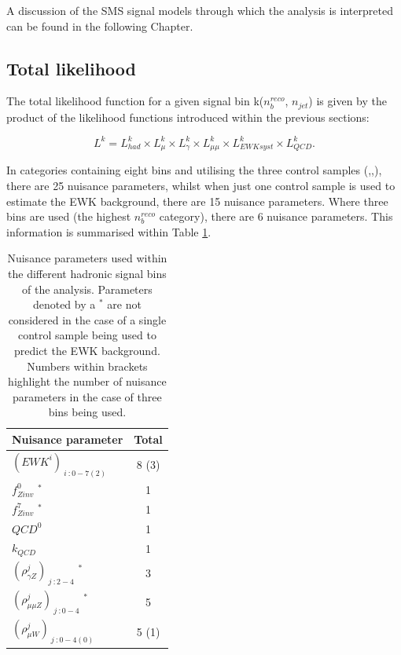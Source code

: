 A discussion of the \ac{SMS} signal models through which the analysis is interpreted can be found in the following Chapter. 

\subsection{Total likelihood}
\label{subsec:totallikelihood}

The total likelihood function for a given signal bin k($n_{b}^{reco}$, $n_{jet}$) is given by the product of the likelihood functions introduced within the previous sections:

\begin{equation}
L^{k} = L^{k}_{had} \times  L^{k}_{\mu} \times  L^{k}_{\gamma} \times  L^{k}_{\mu\mu} \times  L^{k}_{EWK syst} \times  L^{k}_{QCD}.
\end{equation}

In categories containing eight \theht bins and utilising the three control samples (\mupjets,\dimupjets,\gpjets), there are 25 nuisance parameters, whilst when just one control sample is used to estimate the \ac{EWK} background, there are 15 nuisance parameters. Where three \theht bins are used (the highest $n_{b}^{reco}$ category), there are 6 nuisance parameters. This information is summarised within Table \ref{tab:nuisanceparameters}.

 \begin{table}[h!]
 \footnotesize
\begin{center}
\begin{tabular*}{0.45\textwidth}{@{\extracolsep{\fill}}lc}
\hline
Nuisance parameter & Total \\
\hline\hline
$(EWK^{i})_{\ i\ : 0-7(2)}$ & 8 (3) \\
$f^{0}_{Zinv}$ $^{*}$ & 1 \\
 $f^{7}_{Zinv}$ $^{*}$ & 1 \\
 $QCD^{0}$ & 1 \\
 $k_{QCD}$ & 1 \\
 $(\rho^{j}_{\gamma Z})_{\ j \ : 2-4}$ $^{*}$ & 3 \\
 $(\rho^{j}_{\mu\mu Z})_{\ j \ : 0-4}$  $^{*}$ & 5 \\
 $(\rho^{j}_{\mu W})_{\ j \ : 0-4(0)}$ & 5 (1) \\
\end{tabular*}
\end{center}
\caption[Nuisance parameters used within the different hadronic signal bins of the analysis]{Nuisance parameters used within the different hadronic signal bins of the analysis. Parameters denoted by a $^{*}$ are not considered in the case of a single control sample being used to predict the \ac{EWK} background. Numbers within brackets highlight the number of nuisance parameters in the case of three \theht bins being used.}\label{tab:nuisanceparameters}
\end{table}

